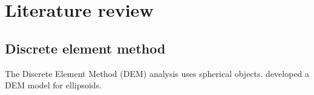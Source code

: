 \chapter{Literature review}

\section{Discrete element method }

The Discrete Element Method (DEM) analysis \citep{Cundall-1979} uses spherical objects. \citet{Lin:1997} developed a DEM model for ellipsoids.